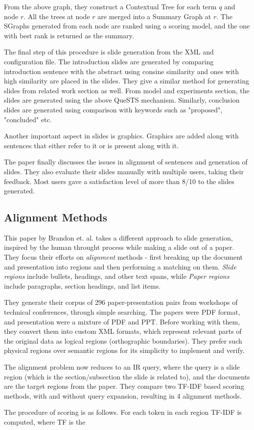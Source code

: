 \documentclass[conference]{IEEEtran}
\begin{document}
From the above graph, they construct a Contextual Tree for each term $q$ and node $r$.
All the trees at node $r$ are merged into a Summary Graph at $r$. The SGraphs generated
from each node are ranked using a scoring model, and the one with best rank is returned as
the summary.

The final step of this procedure is slide generation from the XML and configuration file.
The introduction slides are generated by comparing introduction sentence with the abstract 
using consine similarity and ones with high similarity are placed in the slides.
They give a similar method for generating slides from related work section as well.
From model and experiments section, the slides are generated using the above QueSTS
mechanism. Similarly, conclusion slides are generated using comparison with keywords
such as "proposed", "concluded" etc.

Another important aspect in slides is graphics. Graphics are added along with sentences 
that either refer to it or is present along with it.

The paper finally discusses the issues in alignment of sentences and generation of slides.
They also evaluate their slides manually with multiple users, taking their feedback.
Most users gave a satisfaction level of more than 8/10 to the slides generated.

\subsection{Alignment Methods}
This paper by Brandon et. al. \cite{brandon} takes a different approach to slide generation,
inspired by the human throught process while making a slide out of a paper.
They focus their efforts on \textit{alignment} methods - first breaking up the document and
presentation into regions and then performing a matching on them.
\textit{Slide regions} include bullets, headings, and other text spans, while \textit{Paper regions}
include paragraphs, section headings, and list items.

They generate their corpus of 296 paper-presentation pairs from workshops of technical conferences,
through simple searching. The papers were PDF format, and presentation were a mixture of PDF and PPT.
Before working with them, they convert them into custom XML formats, which represent relevant parts of
the original data as logical regions (orthographic boundaries). They prefer such physical regions over
semantic regions for its simplicity to implement and verify.

The alignment problem now reduces to an IR query, where the query is a slide region (which is the
section/subsection the slide is related to), and the documents are the target regions from the paper.
They compare two TF-IDF based scoring methods, with and without query expansion, resulting in 4
alignment methods.

The procedure of scoring is as follows. For each token in each region TF-IDF is computed, where TF is
the 




{\small


}
\end{document}
